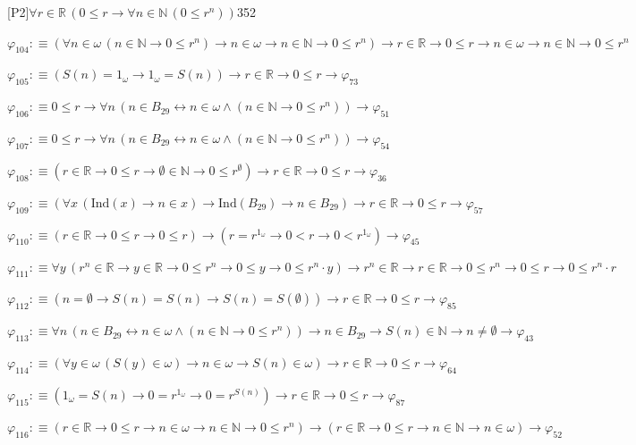 \begin{fullproof}{[P2]}{$\forall r \in \mathbb{R}\,(0 \leq r \to \forall n \in \mathbb{N}\,(0 \leq {{r}^{n}}))$}{352}
\begin{abbrevlist}
\item $\varphi_{104} :\equiv (\forall n \in \omega\,(n \in \mathbb{N} \to 0 \leq {{r}^{n}}) \to n \in \omega \to n \in \mathbb{N} \to 0 \leq {{r}^{n}}) \to r \in \mathbb{R} \to 0 \leq r \to n \in \omega \to n \in \mathbb{N} \to 0 \leq {{r}^{n}}$
\item $\varphi_{105} :\equiv (S(n) = 1_{\omega} \to 1_{\omega} = S(n)) \to r \in \mathbb{R} \to 0 \leq r \to \varphi_{73}$
\item $\varphi_{106} :\equiv 0 \leq r \to \forall n\,(n \in B_{29} \leftrightarrow n \in \omega \land (n \in \mathbb{N} \to 0 \leq {{r}^{n}})) \to \varphi_{51}$
\item $\varphi_{107} :\equiv 0 \leq r \to \forall n\,(n \in B_{29} \leftrightarrow n \in \omega \land (n \in \mathbb{N} \to 0 \leq {{r}^{n}})) \to \varphi_{54}$
\item $\varphi_{108} :\equiv (r \in \mathbb{R} \to 0 \leq r \to \emptyset \in \mathbb{N} \to 0 \leq {{r}^{\emptyset}}) \to r \in \mathbb{R} \to 0 \leq r \to \varphi_{36}$
\item $\varphi_{109} :\equiv (\forall x\,(\mathrm{Ind}(x) \to n \in x) \to \mathrm{Ind}(B_{29}) \to n \in B_{29}) \to r \in \mathbb{R} \to 0 \leq r \to \varphi_{57}$
\item $\varphi_{110} :\equiv (r \in \mathbb{R} \to 0 \leq r \to 0 \leq r) \to (r = {{r}^{1_{\omega}}} \to 0 < r \to 0 < {{r}^{1_{\omega}}}) \to \varphi_{45}$
\item $\varphi_{111} :\equiv \forall y\,({{r}^{n}} \in \mathbb{R} \to y \in \mathbb{R} \to 0 \leq {{r}^{n}} \to 0 \leq y \to 0 \leq {{r}^{n}} \cdot y) \to {{r}^{n}} \in \mathbb{R} \to r \in \mathbb{R} \to 0 \leq {{r}^{n}} \to 0 \leq r \to 0 \leq {{r}^{n}} \cdot r$
\item $\varphi_{112} :\equiv (n = \emptyset \to S(n) = S(n) \to S(n) = S(\emptyset)) \to r \in \mathbb{R} \to 0 \leq r \to \varphi_{85}$
\item $\varphi_{113} :\equiv \forall n\,(n \in B_{29} \leftrightarrow n \in \omega \land (n \in \mathbb{N} \to 0 \leq {{r}^{n}})) \to n \in B_{29} \to S(n) \in \mathbb{N} \to n \neq \emptyset \to \varphi_{43}$
\item $\varphi_{114} :\equiv (\forall y \in \omega\,(S(y) \in \omega) \to n \in \omega \to S(n) \in \omega) \to r \in \mathbb{R} \to 0 \leq r \to \varphi_{64}$
\item $\varphi_{115} :\equiv (1_{\omega} = S(n) \to 0 = {{r}^{1_{\omega}}} \to 0 = {{r}^{S(n)}}) \to r \in \mathbb{R} \to 0 \leq r \to \varphi_{87}$
\item $\varphi_{116} :\equiv (r \in \mathbb{R} \to 0 \leq r \to n \in \omega \to n \in \mathbb{N} \to 0 \leq {{r}^{n}}) \to (r \in \mathbb{R} \to 0 \leq r \to n \in \mathbb{N} \to n \in \omega) \to \varphi_{52}$

\end{abbrevlist}
\end{fullproof}
